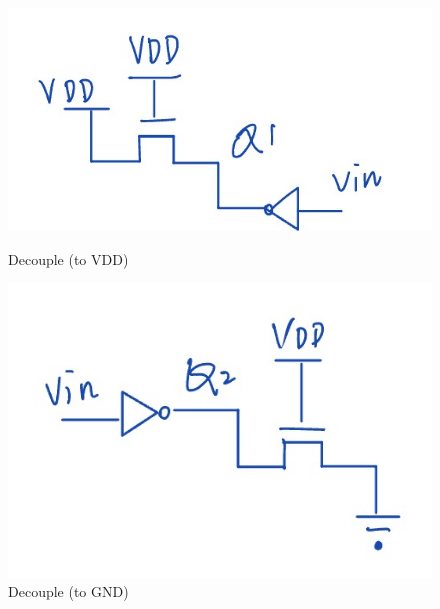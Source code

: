 \documentclass[a4paper]{article}
\begin{document}
\begin{figure}[!htbp]
\centering
\begin{minipage}[t]{0.45\textwidth}
\centering
\includegraphics[width=\linewidth]{./img/2023-11-16-14-50-00.png}
\caption{Decouple (to VDD)}
\label{r}
\end{minipage}
\qquad
\begin{minipage}[t]{0.4\textwidth}
\centering
\includegraphics[width=\linewidth]{./img/2023-11-16-14-52-25.png}
\caption{Decouple (to GND)}
\label{w}
\end{minipage}
\end{figure}
\end{document}
